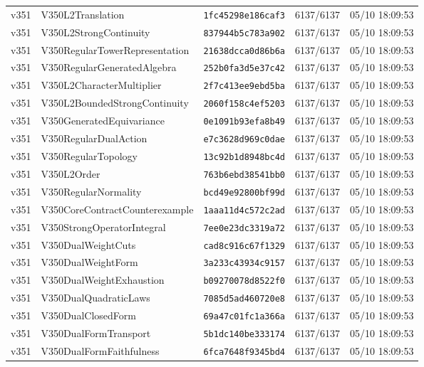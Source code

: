 \documentclass[11pt]{article}
\theoremstyle{definition}\newtheorem{deriv}{Derivação}
\begin{document}
{\begin{longtable}{@{}lllll@{}}
v351 & V350L2Translation & \texttt{1fc45298e186caf3} & 6137/6137 & 05/10 18:09:53 \\
v351 & V350L2StrongContinuity & \texttt{837944b5c783a902} & 6137/6137 & 05/10 18:09:53 \\
v351 & V350RegularTowerRepresentation & \texttt{21638dcca0d86b6a} & 6137/6137 & 05/10 18:09:53 \\
v351 & V350RegularGeneratedAlgebra & \texttt{252b0fa3d5e37c42} & 6137/6137 & 05/10 18:09:53 \\
v351 & V350L2CharacterMultiplier & \texttt{2f7c413ee9ebd5ba} & 6137/6137 & 05/10 18:09:53 \\
v351 & V350L2BoundedStrongContinuity & \texttt{2060f158c4ef5203} & 6137/6137 & 05/10 18:09:53 \\
v351 & V350GeneratedEquivariance & \texttt{0e1091b93efa8b49} & 6137/6137 & 05/10 18:09:53 \\
v351 & V350RegularDualAction & \texttt{e7c3628d969c0dae} & 6137/6137 & 05/10 18:09:53 \\
v351 & V350RegularTopology & \texttt{13c92b1d8948bc4d} & 6137/6137 & 05/10 18:09:53 \\
v351 & V350L2Order & \texttt{763b6ebd38541bb0} & 6137/6137 & 05/10 18:09:53 \\
v351 & V350RegularNormality & \texttt{bcd49e92800bf99d} & 6137/6137 & 05/10 18:09:53 \\
v351 & V350CoreContractCounterexample & \texttt{1aaa11d4c572c2ad} & 6137/6137 & 05/10 18:09:53 \\
v351 & V350StrongOperatorIntegral & \texttt{7ee0e23dc3319a72} & 6137/6137 & 05/10 18:09:53 \\
v351 & V350DualWeightCuts & \texttt{cad8c916c67f1329} & 6137/6137 & 05/10 18:09:53 \\
v351 & V350DualWeightForm & \texttt{3a233c43934c9157} & 6137/6137 & 05/10 18:09:53 \\
v351 & V350DualWeightExhaustion & \texttt{b09270078d8522f0} & 6137/6137 & 05/10 18:09:53 \\
v351 & V350DualQuadraticLaws & \texttt{7085d5ad460720e8} & 6137/6137 & 05/10 18:09:53 \\
v351 & V350DualClosedForm & \texttt{69a47c01fc1a366a} & 6137/6137 & 05/10 18:09:53 \\
v351 & V350DualFormTransport & \texttt{5b1dc140be333174} & 6137/6137 & 05/10 18:09:53 \\
v351 & V350DualFormFaithfulness & \texttt{6fca7648f9345bd4} & 6137/6137 & 05/10 18:09:53 \\

\end{longtable}}
\end{document}
